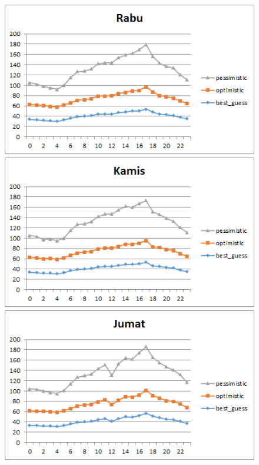 \begin{figure}[H]
				\centering		
				\includegraphics[]{Gambar/rabusampel108052017.png}
				\includegraphics[]{Gambar/kamissampel108052017.png}
				\includegraphics[]{Gambar/jumatsampel108052017.png}
\end{figure}	
			
